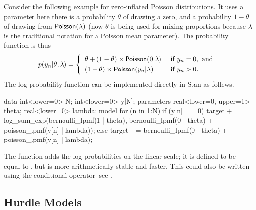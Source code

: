 Consider the following example for zero-inflated Poisson
distributions.  It uses a parameter  here there is a
probability $\theta$ of drawing a zero, and a probability $1 - \theta$
of drawing from $\distro{Poisson}(\lambda)$ (now $\theta$ is being
used for mixing proportions because $\lambda$ is the traditional
notation for a Poisson mean parameter).  The probability function is
thus
\[
p(y_n|\theta,\lambda) 
= 
\left\{
\begin{array}{ll}
\theta + (1 - \theta) \times \distro{Poisson}(0|\lambda) & \mbox{ if } y_n = 0, \mbox{ and}
\\[3pt]
(1-\theta) \times \distro{Poisson}(y_n|\lambda) & \mbox{ if } y_n > 0.
\end{array}
\right.
\] 
%
The log probability function can be implemented directly in Stan as follows.
%
\begin{stancode}
data {
  int<lower=0> N;
  int<lower=0> y[N];
}
parameters {
  real<lower=0, upper=1> theta;
  real<lower=0> lambda;
}
model {
  for (n in 1:N) {
    if (y[n] == 0)
      target += log_sum_exp(bernoulli_lpmf(1 | theta),
                            bernoulli_lpmf(0 | theta) 
                              + poisson_lpmf(y[n] | lambda));
    else
      target += bernoulli_lpmf(0 | theta)
                  + poisson_lpmf(y[n] | lambda);
  }
}
\end{stancode}
%
The  function adds the log probabilities
on the linear scale; it is defined to be equal to , but is more arithmetically stable and faster.  This
could also be written using the conditional operator; see
.

\subsection{Hurdle Models}

